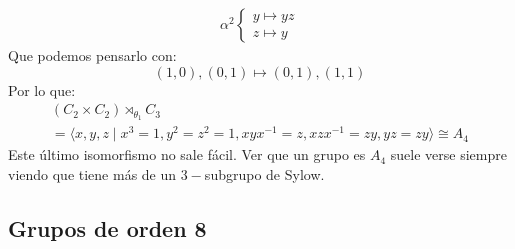 \begin{itemize}
\begin{itemize}
\begin{gather*}
                    \alpha^2\left\{\begin{array}{l}
                        y\longmapsto yz \\
                        z \longmapsto y
                    \end{array}\right.
                \end{gather*}
                Que podemos pensarlo con:
                \begin{equation*}
                    (1,0), (0,1) \longmapsto (0,1), (1,1)
                \end{equation*}
                Por lo que:
                \begin{multline*}
                    (C_2\times C_2)\rtimes_{\theta_1} C_3 \\ = \langle x,y,z\mid x^3=1, y^2 = z^2 = 1, xyx^{-1}=z, xzx^{-1}=zy, yz = zy \rangle  \cong A_4
                \end{multline*}
                Este último isomorfismo no sale fácil. Ver que un grupo es $A_4$ suele verse siempre viendo que tiene más de un $3-$subgrupo de Sylow.
        \end{itemize}
\end{itemize}

\subsection{Grupos de orden 8}


